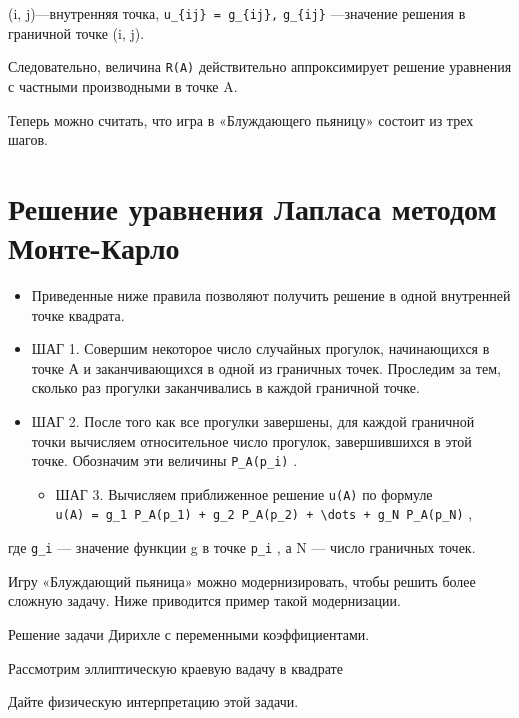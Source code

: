 \documentclass[
  ukrainian,
]{article}
\providecommand{\tightlist}{%
  \setlength{\itemsep}{0pt}\setlength{\parskip}{0pt}}
\begin{document}
(i, j)---внутренняя точка, \texttt{u\_\{ij\}\ =\ g\_\{ij\},}
\texttt{g\_\{ij\}} ---значение решения в граничной точке (i, j).

Следовательно, величина \texttt{R(A)} действительно аппроксимирует
решение уравнения с частными производными в точке A.

Теперь можно считать, что игра в «Блуждающего пьяницу» состоит из трех
шагов.

\section{Решение уравнения Лапласа методом
Монте-Карло}\label{ux440ux435ux448ux435ux43dux438ux435-ux443ux440ux430ux432ux43dux435ux43dux438ux44f-ux43bux430ux43fux43bux430ux441ux430-ux43cux435ux442ux43eux434ux43eux43c-ux43cux43eux43dux442ux435-ux43aux430ux440ux43bux43e}

\begin{itemize}
\tightlist
\item
  Приведенные ниже правила позволяют получить решение в одной внутренней
  точке квадрата.
\item
  ШАГ 1. Совершим некоторое число случайных прогулок, начинающихся в
  точке А и заканчивающихся в одной из граничных точек. Проследим за
  тем, сколько раз прогулки заканчивались в каждой граничной точке.
\item
  ШАГ 2. После того как все прогулки завершены, для каждой граничной
  точки вычисляем относительное число прогулок, завершившихся в этой
  точке. Обозначим эти величины \texttt{P\_A(p\_i)} .

  \begin{itemize}
  \tightlist
  \item
    ШАГ 3. Вычисляем приближенное решение \texttt{u(A)} по формуле
    \texttt{u(A)\ =\ g\_1\ P\_A(p\_1)\ +\ g\_2\ P\_A(p\_2)\ +\ \textbackslash{}dots\ +\ g\_N\ P\_A(p\_N)}
    ,
  \end{itemize}
\end{itemize}

где \texttt{g\_i} --- значение функции g в точке \texttt{p\_i} , а N ---
число граничных точек.

Игру «Блуждающий пьяница» можно модернизировать, чтобы решить более
сложную задачу. Ниже приводится пример такой модернизации.

Решение задачи Дирихле с переменными коэффициентами.

Рассмотрим эллиптическую краевую вадачу в квадрате

Дайте физическую интерпретацию этой задачи.
\end{document}
